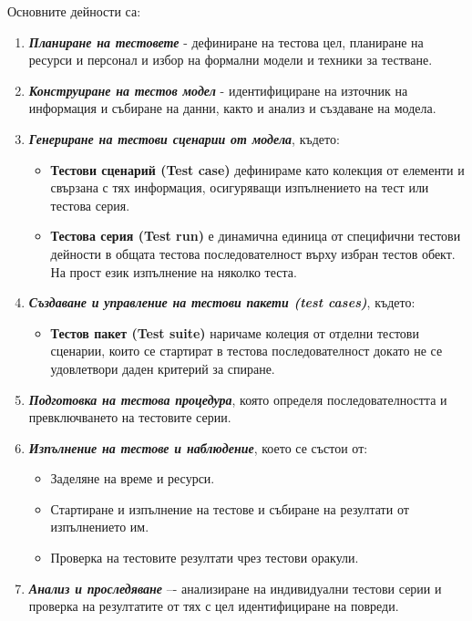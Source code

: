 \documentclass[fleqn,12pt]{article}
\begin{document}
Основните дейности са:
\begin{enumerate}
    \item \textbf{\textit{Планиране на тестовете}} - дефиниране на тестова цел, планиране на ресурси и персонал и избор на формални модели и техники за тестване.
    \item \textbf{\textit{Конструиране на тестов модел}} - идентифициране на източник на информация и събиране на данни, както и анализ и създаване на модела.
    \item \textbf{\textit{Генериране на тестови сценарии от модела}}, където:
    \begin{itemize}
        \item \textbf{Тестови сценарий (Test case)} дефинираме като колекция от елементи и свързана с тях информация, осигуряващи изпълнението на тест или тестова серия.
        \item \textbf{Тестова серия (Test run)} е динамична единица от специфични тестови дейности в общата тестова последователност върху избран тестов обект.
        На прост език изпълнение на няколко теста.
    \end{itemize}
    \item \textbf{\textit{Създаване и управление на тестови пакети (test cases)}}, където:
    \begin{itemize}
        \item \textbf{Тестов пакет (Test suite)} наричаме колеция от отделни тестови сценарии, които се стартират в тестова последователност докато не се удовлетвори даден критерий за спиране.
    \end{itemize}
    \item \textbf{\textit{Подготовка на тестова процедура}}, която определя последователността и превключването на тестовите серии.
    \item \textbf{\textit{Изпълнение на тестове и наблюдение}}, което се състои от:
    \begin{itemize}
        \item Заделяне на време и ресурси.
        \item Стартиране и изпълнение на тестове и събиране на резултати от изпълнението им.
        \item Проверка на тестовите резултати чрез тестови оракули.
    \end{itemize}
    \item \textbf{\textit{Анализ и проследяване}} –- анализиране на индивидуални тестови серии и проверка на резултатите от тях с цел идентифициране на повреди.
\end{enumerate}
\end{document}
